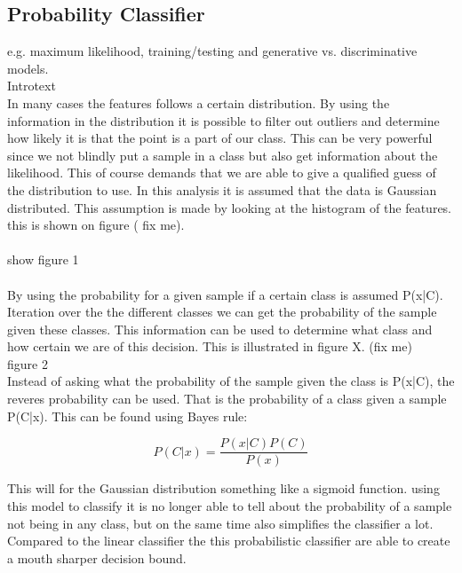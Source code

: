 \subsection{Probability Classifier}

e.g. maximum likelihood, training/testing and generative vs. discriminative models.\\

Introtext\\

In many cases the features follows a certain distribution. By using the information in the distribution it is possible to filter out outliers and determine how likely it is that the point is a part of our class. This can be very powerful since we not blindly put a sample in a class but also get information about the likelihood. This of course demands that we are able to give a qualified guess of the distribution to use. In this analysis it is assumed that the data is Gaussian distributed. This assumption is made by looking at the histogram of the features. this is shown on figure ( fix me).\\\\


show figure 1\\\\


By using the probability for a given sample if a certain class is assumed P(x|C). Iteration over the the different classes we can get the probability of the sample given these classes. This information can be used to determine what class and how certain we are of this decision. 
This is illustrated in figure X. (fix me)\\

figure 2\\


Instead of asking what the probability of the sample given the class is P(x|C), the reveres probability can be used. That is the probability of a class given a sample P(C|x). This can be found using Bayes rule:

\begin{equation}
 P(C|x)=\frac{P(x|C)P(C)}{P(x)}
\end{equation}

This will for the Gaussian distribution something like a sigmoid function. using this model to classify it is no longer able to tell about the probability of a sample not being in any class, but on the same time also simplifies the classifier a lot. Compared to the linear classifier the this probabilistic classifier are able to create a mouth sharper decision bound. \\

